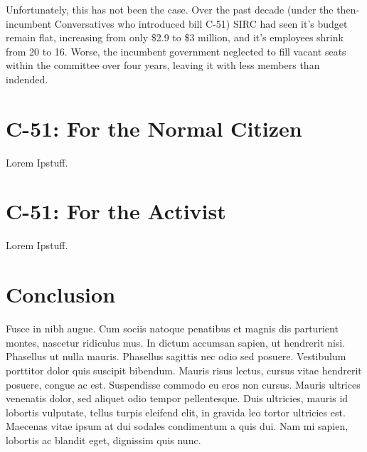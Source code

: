 \documentclass[a4paper, 11pt]{article} %
\begin{document}
Unfortunately, this has not been the case. Over the past decade (under the then-incumbent Conversatives who introduced bill C-51) SIRC had seen it's budget remain flat, increasing from only \$2.9 to \$3 million, and it's employees shrink from 20 to 16. Worse, the incumbent government neglected to fill vacant seats within the committee over four years, leaving it with less members than indended. \cite{watchdog-starved}

\section*{C-51: For the Normal Citizen}
Lorem Ipstuff.

\section*{C-51: For the Activist}
Lorem Ipstuff.


\section*{Conclusion}
Fusce in nibh augue. Cum sociis natoque penatibus et magnis dis parturient montes, nascetur ridiculus mus. In dictum accumsan sapien, ut hendrerit nisi. Phasellus ut nulla mauris. Phasellus sagittis nec odio sed posuere. Vestibulum porttitor dolor quis suscipit bibendum. Mauris risus lectus, cursus vitae hendrerit posuere, congue ac est. Suspendisse commodo eu eros non cursus. Mauris ultrices venenatis dolor, sed aliquet odio tempor pellentesque. Duis ultricies, mauris id lobortis vulputate, tellus turpis eleifend elit, in gravida leo tortor ultricies est. Maecenas vitae ipsum at dui sodales condimentum a quis dui. Nam mi sapien, lobortis ac blandit eget, dignissim quis nunc.







\end{document}
